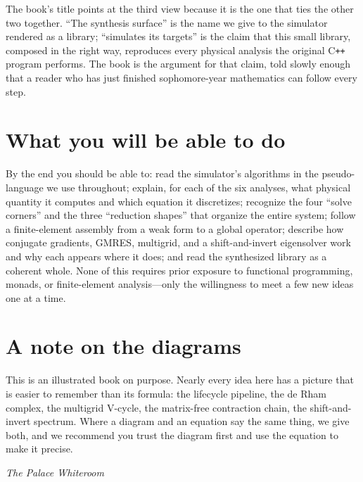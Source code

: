 The book's title points at the third view because it is the one that ties the
other two together. ``The synthesis surface'' is the name we give to the
simulator rendered as a library; ``simulates its targets'' is the claim that
this small library, composed in the right way, reproduces every physical
analysis the original C\texttt{++} program performs. The book is the argument
for that claim, told slowly enough that a reader who has just finished
sophomore-year mathematics can follow every step.

\section*{What you will be able to do}

By the end you should be able to: read the simulator's algorithms in the
pseudo-language we use throughout; explain, for each of the six analyses, what
physical quantity it computes and which equation it discretizes; recognize the
four ``solve corners'' and the three ``reduction shapes'' that organize the
entire system; follow a finite-element assembly from a weak form to a global
operator; describe how conjugate gradients, GMRES, multigrid, and a
shift-and-invert eigensolver work and why each appears where it does; and read
the synthesized library as a coherent whole. None of this requires prior
exposure to functional programming, monads, or finite-element analysis---only
the willingness to meet a few new ideas one at a time.

\section*{A note on the diagrams}

This is an illustrated book on purpose. Nearly every idea here has a picture
that is easier to remember than its formula: the lifecycle pipeline, the de Rham
complex, the multigrid V-cycle, the matrix-free contraction chain, the
shift-and-invert spectrum. Where a diagram and an equation say the same thing,
we give both, and we recommend you trust the diagram first and use the equation
to make it precise.

\vspace{1em}
\noindent\hfill\textit{The Palace Whiteroom}\hfill\null
